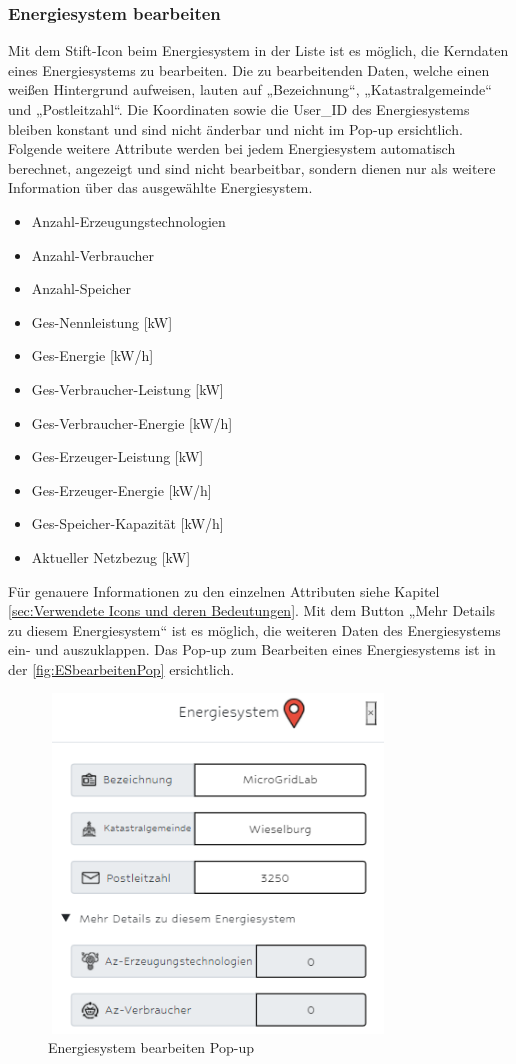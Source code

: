 \subsubsection{Energiesystem bearbeiten}
Mit dem Stift-Icon beim Energiesystem in der Liste ist es möglich, die Kerndaten eines Energiesystems zu bearbeiten. Die zu bearbeitenden Daten, welche einen weißen Hintergrund  aufweisen, lauten auf „Bezeichnung“, „Katastralgemeinde“ und „Postleitzahl“. Die Koordinaten sowie die User\_ID des Energiesystems bleiben konstant und sind nicht änderbar und nicht im Pop-up ersichtlich.
Folgende weitere Attribute werden bei jedem Energiesystem automatisch berechnet, angezeigt und sind nicht bearbeitbar, sondern dienen nur als weitere Information über das ausgewählte Energiesystem. 
\begin{itemize}
	\item Anzahl-Erzeugungstechnologien  
	\item Anzahl-Verbraucher
	\item Anzahl-Speicher
	\item Ges-Nennleistung [kW]
	\item Ges-Energie [kW/h]
	\item Ges-Verbraucher-Leistung [kW]
	\item Ges-Verbraucher-Energie [kW/h]
	\item Ges-Erzeuger-Leistung [kW]
	\item Ges-Erzeuger-Energie [kW/h]
	\item Ges-Speicher-Kapazität [kW/h]
	\item Aktueller Netzbezug [kW]
\end{itemize}
Für genauere Informationen zu den einzelnen Attributen siehe Kapitel  \ref{sec:Verwendete Icons und deren Bedeutungen}.
Mit dem Button „Mehr Details zu diesem Energiesystem“ ist es möglich, die weiteren Daten des Energiesystems ein- und auszuklappen. 
Das Pop-up zum Bearbeiten eines Energiesystems ist in der \autoref{fig:ESbearbeitenPop} ersichtlich.
\begin{figure}[h]
	\centering
	\includegraphics[height=9cm,width=9cm]{images/ESbearbeitenPop}
	\caption{Energiesystem bearbeiten Pop-up}
	\label{fig:ESbearbeitenPop}
\end{figure}

